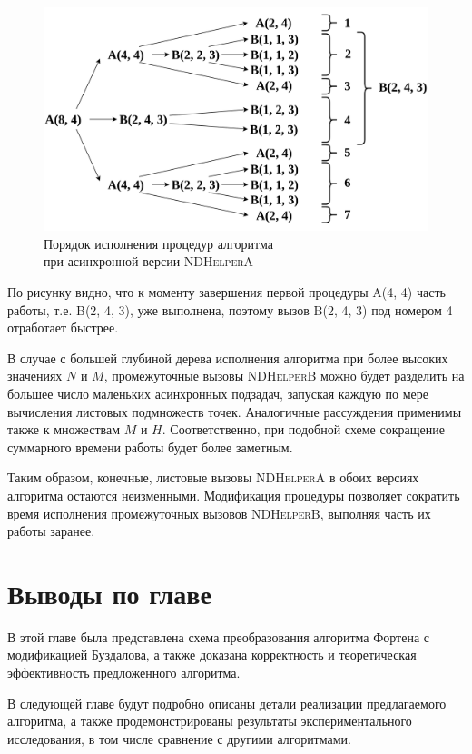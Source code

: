 \begin{figure}[h]
\centering
\includegraphics[width=\textwidth]{images/async_nda.png}
    \caption{Порядок исполнения процедур алгоритма\\при асинхронной версии \textsc{NDHelperA}}
\end{figure}

По рисунку видно, что к моменту завершения первой процедуры \textsc{A(4, 4)} часть работы, т.е. \textsc{B(2, 4, 3)}, уже выполнена, поэтому вызов \textsc{B(2, 4, 3)} под номером 4 отработает быстрее.

В случае с большей глубиной дерева исполнения алгоритма при более высоких значениях $N$ и $M$, промежуточные вызовы \textsc{NDHelperB} можно будет разделить на большее число маленьких асинхронных подзадач, запуская каждую по мере вычисления листовых подмножеств точек.
Аналогичные рассуждения применимы также к множествам $M$ и $H$.
Соответственно, при подобной схеме сокращение суммарного времени работы будет более заметным.

Таким образом, конечные, листовые вызовы \textsc{NDHelperA} в обоих версиях алгоритма остаются неизменными.
Модификация процедуры позволяет сократить время исполнения промежуточных вызовов \textsc{NDHelperB}, выполняя часть их работы заранее.

\section{Выводы по главе}
В этой главе была представлена схема преобразования алгоритма Фортена с модификацией Буздалова, а также доказана корректность и теоретическая эффективность предложенного алгоритма.

В следующей главе будут подробно описаны детали реализации предлагаемого алгоритма, а также продемонстрированы результаты экспериментального исследования, в том числе сравнение с другими алгоритмами.
